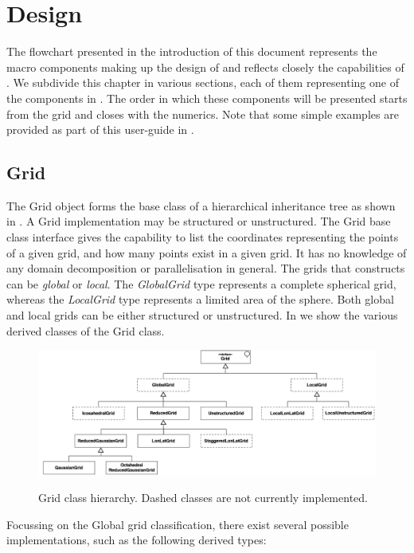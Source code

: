 \chapter{Design}
\label{chap:structure}
The flowchart presented in the introduction of this document 
represents the macro components making up the design of \Atlas
and reflects closely the capabilities of \Atlas. We subdivide this 
chapter in various sections, each of them representing one 
of the components in . The order in 
which these components will be presented starts from the grid 
and closes with the numerics. Note that some simple examples 
are provided as part of this user-guide in .


\section{Grid}
%
The Grid object forms the base class of a hierarchical inheritance tree 
as shown in . A Grid implementation may be structured or
unstructured. The Grid base class interface gives the capability to 
list the coordinates representing the points of a given grid, and how many
points exist in a given grid. It has no knowledge of any domain decomposition
or parallelisation in general.
The grids that \Atlas constructs can be \textit{global} or 
\textit{local}. The \textit{GlobalGrid} type represents a complete
spherical grid, whereas the \textit{LocalGrid} type represents a limited 
area of the sphere. Both global and local grids can be either 
structured or unstructured. In  we show the 
various derived classes of the Grid class.
%
\begin{figure}[htb]
\centering
\includegraphics[scale=0.3]{imgs/grids.png}
\label{fig:grids}
\caption{Grid class hierarchy. Dashed classes are not currently implemented.}
\end{figure}
%
Focussing on the Global grid classification, there exist several
possible implementations, such as the following derived types: 
